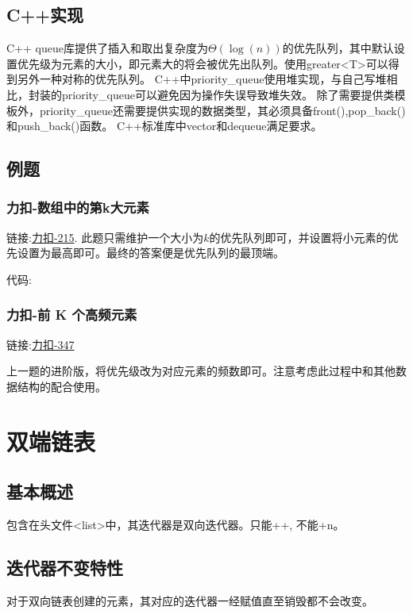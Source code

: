 \documentclass{article}
\begin{document}
    \subsection{C++实现}
    C++ queue库提供了插入和取出复杂度为$\Theta(\log(n))$的优先队列，其中默认设置优先级为元素的大小，即元素大的将会被优先出队列。使用greater<T>可以得到另外一种对称的优先队列。
    C++中priority\_queue使用堆实现，与自己写堆相比，封装的priority\_queue可以避免因为操作失误导致堆失效。
    除了需要提供类模板外，priority\_queue还需要提供实现的数据类型，其必须具备front(),pop\_back()和push\_back()函数。
    C++标准库中vector和dequeue满足要求。

    \subsection{例题}
    \subsubsection{力扣-数组中的第k大元素}
    链接:\href{https://leetcode.cn/problems/kth-largest-element-in-an-array/}{力扣-215}.
    此题只需维护一个大小为$k$的优先队列即可，并设置将小元素的优先设置为最高即可。最终的答案便是优先队列的最顶端。

    代码:
    

    \subsubsection{力扣-前 K 个高频元素}
    链接:\href{https://leetcode.cn/problems/top-k-frequent-elements/description/}{力扣-347}

    上一题的进阶版，将优先级改为对应元素的频数即可。注意考虑此过程中和其他数据结构的配合使用。
    

    \section{双端链表}
    
    \subsection{基本概述}
    包含在头文件<list>中，其迭代器是双向迭代器。只能++, 不能+n。

    \subsection{迭代器不变特性}
    对于双向链表创建的元素，其对应的迭代器一经赋值直至销毁都不会改变。
\end{document}
